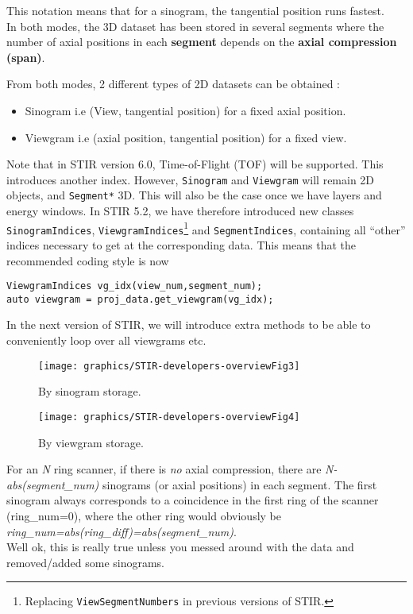 \documentclass{article}
\begin{document}
This notation means that for a sinogram, the tangential position 
runs fastest.\\
In both modes, the 3D dataset has been stored in several segments 
where the number of axial positions in each \textbf{segment} depends 
on the \textbf{axial compression (span)}.


From both modes, 2 different types of 2D datasets can be obtained 
:
\begin{itemize}
\item Sinogram i.e (View, tangential position) for a fixed axial 
position.
\item Viewgram i.e (axial position, tangential position) for a fixed 
view.
\end{itemize} 

Note that in STIR version 6.0, Time-of-Flight (TOF) will be supported. This introduces another
index. However, \texttt{Sinogram} and \texttt{Viewgram} will remain 2D objects, and \texttt{Segment*} 3D.
This will also be the case once we have layers and energy windows.
In STIR 5.2, we have therefore introduced new classes
\texttt{SinogramIndices}, \texttt{ViewgramIndices}\footnote{Replacing \texttt{ViewSegmentNumbers} in previous versions of STIR.}
and \texttt{SegmentIndices}, containing all ``other''
indices necessary to get at the corresponding data. This means that the recommended coding style is now
\begin{verbatim}
ViewgramIndices vg_idx(view_num,segment_num);
auto viewgram = proj_data.get_viewgram(vg_idx);
\end{verbatim}
In the next version of STIR, we will introduce extra methods to be able to conveniently loop over all viewgrams etc.

\begin{figure}[htbp]
\begin{center}
\texttt{[image: graphics/STIR-developers-overviewFig3]}
\caption{By sinogram storage.}
\label{fig:sinogramstorage}
\end{center}
\end{figure}

\begin{figure}[htbp]
\begin{center}
\texttt{[image: graphics/STIR-developers-overviewFig4]}
\caption{By viewgram storage.}
\label{fig:viewgramstorage}
\end{center}
\end{figure}


For an \textit{N} ring scanner, if there is \textit{no} axial compression, 
there are \textit{N-abs(segment\_num)}  sinograms (or axial positions) 
in each segment. The first sinogram always corresponds to a coincidence 
in the first ring of the scanner (ring\_num=0), where the other 
ring would obviously be \textit{ring\_num=abs(ring\_diff)=abs(segment\_num)}. 
\\
Well ok, this is really true unless you messed around with the 
data and removed/added some sinograms. 
\end{document}
